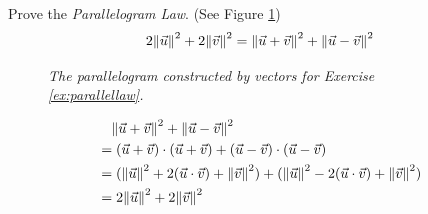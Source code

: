 \begin{Exercise}
\label{ex:parallellaw}
Prove the \textit{Parallelogram Law}. (See Figure \ref{fig:parallellaw})
\begin{align}
2\norm{\vec{u}}^2 + 2\norm{\vec{v}}^2 = \norm{\vec{u}+\vec{v}}^2 + \norm{\vec{u}-\vec{v}}^2
\end{align}
\end{Exercise}
\begin{figure}
\centering
{}
\caption{\textit{The parallelogram constructed by vectors for Exercise \ref{ex:parallellaw}.}}
\label{fig:parallellaw}
\end{figure}
\begin{Answer}
\begin{align*}
&\quad \norm{\vec{u}+\vec{v}}^2 + \norm{\vec{u}-\vec{v}}^2 \\
&= (\vec{u}+\vec{v}) \cdot (\vec{u}+\vec{v}) + (\vec{u}-\vec{v}) \cdot (\vec{u}-\vec{v}) \\
&= (\norm{\vec{u}}^2 + 2(\vec{u} \cdot \vec{v}) + \norm{\vec{v}}^2) + (\norm{\vec{u}}^2 - 2(\vec{u} \cdot \vec{v}) + \norm{\vec{v}}^2) \\
&= 2\norm{\vec{u}}^2 + 2\norm{\vec{v}}^2
\end{align*}
\end{Answer}


